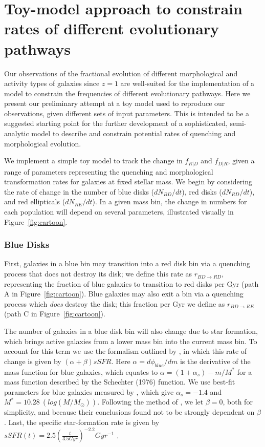 \documentclass[useAMS,usenatbib]{mn2e}
\begin{document}

  


\newpage
\clearpage

\appendix

\section{Toy-model approach to constrain rates of different evolutionary pathways}

Our observations of the fractional evolution of different morphological and activity types of galaxies since $z=1$ are well-suited for the implementation of a model to constrain the frequencies of different evolutionary pathways. Here we present our preliminary attempt at a toy model used to reproduce our observations, given different sets of input parameters. This is intended to be a suggested starting point for the further development of a sophisticated, semi-analytic model to describe and constrain potential rates of quenching and morphological evolution. 

We implement a simple toy model to track the change in $f_{R|D}$ and $f_{D|R}$, given a range of parameters representing the quenching and morphological transformation rates for galaxies at fixed stellar mass. We begin by considering the rate of change in the number of blue disks ($dN_{BD}/dt$), red disks ($dN_{RD}/dt$), and red ellipticals ($dN_{RE}/dt$). In a given mass bin, the change in numbers for each population will depend on several parameters, illustrated visually in Figure~\ref{fig:cartoon}.

\subsubsection{Blue Disks}
First, galaxies in a blue bin may transition into a red disk bin via a quenching process that does not destroy its disk; we define this rate as $r_{BD \rightarrow RD}$, representing the fraction of blue galaxies to transition to red disks per Gyr (path A in Figure~\ref{fig:cartoon}). Blue galaxies may also exit a bin via a quenching process which \emph{does} destroy the disk; this fraction per Gyr we define as $r_{BD \rightarrow RE}$ (path C in Figure~\ref{fig:cartoon}).

The number of galaxies in a blue disk bin will also change due to star formation, which brings active galaxies from a lower mass bin into the current mass bin. To account for this term we use the formalism outlined by \citet{Peng2010}, in which this rate of change is given by $(\alpha + \beta)sSFR$. Here $\alpha = d\phi_{blue}/dm$ is the derivative of the mass function for blue galaxies, which equates to $\alpha = (1+\alpha_s) - m/M^*$ for a mass function described by the Schechter (1976) function. We use best-fit parameters for blue galaxies measured by \citet{Ichikawa2017}, which give $\alpha_s = -1.4$ and $M^* = 10.28 ~(log(M/M_{\odot}))$. Following the method of \citet{Peng2010}, we let $\beta=0$, both for simplicity, and because their conclusions found not to be strongly dependent on $\beta$. Last, the specific star-formation rate is given by $sSFR(t) = 2.5(\frac{t}{3.5 Gyr})^{-2.2}Gyr^{-1}$ \citep{Peng2010}.
\end{document}
